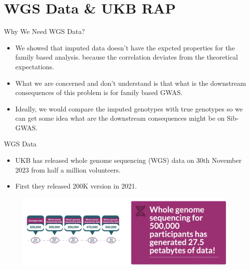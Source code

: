 \documentclass{beamer}
\begin{document}
\section{WGS Data \& UKB RAP}



\begin{frame}{Why We Need WGS Data?}
      

      \begin{itemize}
            \item We showed that imputed data doesn't have the expcted properties for the family based analysis.
            because the correlation deviates from the theoretical expectations. %
            \item What we are concerned and don't understand is that what is the downstream consequences of this problem is for 
            family based GWAS.
            \item Ideally, we would compare the imputed genotypes with true genotypes so we can get some idea what are 
            the downstream consequences might be on Sib-GWAS. 
      \end{itemize}


\end{frame}



\begin{frame}{WGS Data}

      \begin{itemize}
            \item UKB has released whole genome sequencing (WGS) data
            on 30th November 2023 from half a million volunteers.
            \item First they released 200K version in 2021.
      \end{itemize}

      \begin{figure}
            \includegraphics[width = \textwidth]{fig/sc1.png}
      \end{figure}
      

\end{frame}
\end{document}
